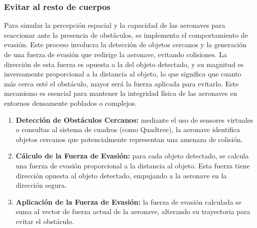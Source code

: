 \subsubsection{Evitar al resto de cuerpos}
Para simular la percepción espacial y la capacidad de las aeronaves para reaccionar ante la presencia de obstáculos, se implementa el comportamiento de evasión. Este proceso involucra la detección de objetos cercanos y la generación de una fuerza de evasión que redirige la aeronave, evitando colisiones. La dirección de esta fuerza es opuesta a la del objeto detectado, y su magnitud es inversamente proporcional a la distancia al objeto, lo que significa que cuanto más cerca esté el obstáculo, mayor será la fuerza aplicada para evitarlo. Este mecanismo es esencial para mantener la integridad física de las aeronaves en entornos densamente poblados o complejos.
\begin{enumerate}
    \item \textbf{Detección de Obstáculos Cercanos:} mediante el uso de sensores virtuales o consultas al sistema de cuadros (como Quadtree), la aeronave identifica objetos cercanos que potencialmente representan una amenaza de colisión.
    \item \textbf{Cálculo de la Fuerza de Evasión:} para cada objeto detectado, se calcula una fuerza de evasión proporcional a la distancia al objeto. Esta fuerza tiene dirección opuesta al objeto detectado, empujando a la aeronave en la dirección segura.
    \item \textbf{Aplicación de la Fuerza de Evasión:} la fuerza de evasión calculada se suma al vector de fuerza actual de la aeronave, alterando su trayectoria para evitar el obstáculo.
\end{enumerate}
